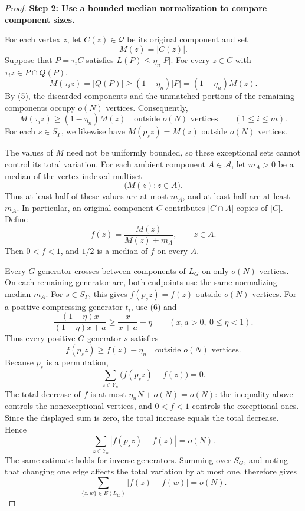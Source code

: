 \documentclass[10pt]{article}
\newcommand{\stephead}[1]{\par\medskip\noindent\textbf{#1}\par\smallskip}
\newcommand{\abs}[1]{\left|#1\right|}
\begin{document}
\begin{proof}
\stephead{Step 2: Use a bounded median normalization to compare component sizes.}
For each vertex $z$, let $C(z)\in\mathcal Q$ be its original component and set
\[
M(z)=\abs{C(z)}.
\]
Suppose that $P=\tau_iC$ satisfies $L(P)\leq\eta_n\abs{P}$. For every $z\in C$ with $\tau_iz\in P\cap Q(P)$,
\[
M(\tau_iz)=\abs{Q(P)}\geq(1-\eta_n)\abs{P}=(1-\eta_n)M(z).
\]
By (5), the discarded components and the unmatched portions of the remaining components occupy $o(N)$ vertices. Consequently,
\begin{equation}
M(\tau_iz)\geq(1-\eta_n)M(z)\quad\text{outside $o(N)$ vertices}\qquad(1\leq i\leq m).
\tag{6}
\end{equation}
For each $s\in S_\Gamma$, we likewise have $M(p_sz)=M(z)$ outside $o(N)$ vertices.

The values of $M$ need not be uniformly bounded, so these exceptional sets cannot control its total variation. For each ambient component $A\in\mathcal A$, let $m_A>0$ be a median of the vertex-indexed multiset
\[
\bigl(M(z):z\in A\bigr).
\]
Thus at least half of these values are at most $m_A$, and at least half are at least $m_A$. In particular, an original component $C$ contributes $\abs{C\cap A}$ copies of $\abs{C}$. Define
\[
f(z)=\frac{M(z)}{M(z)+m_A},\qquad z\in A.
\]
Then $0<f<1$, and $1/2$ is a median of $f$ on every $A$.

Every $G$-generator crosses between components of $L_G$ on only $o(N)$ vertices. On each remaining generator arc, both endpoints use the same normalizing median $m_A$. For $s\in S_\Gamma$, this gives $f(p_sz)=f(z)$ outside $o(N)$ vertices. For a positive compressing generator $t_i$, use (6) and
\[
\frac{(1-\eta)x}{(1-\eta)x+a}\geq\frac{x}{x+a}-\eta\qquad(x,a>0,\ 0\leq\eta<1).
\]
Thus every positive $G$-generator $s$ satisfies
\[
f(p_sz)\geq f(z)-\eta_n\quad\text{outside $o(N)$ vertices}.
\]
Because $p_s$ is a permutation,
\[
\sum_{z\in Y_n}\bigl(f(p_sz)-f(z)\bigr)=0.
\]
The total decrease of $f$ is at most $\eta_nN+o(N)=o(N)$: the inequality above controls the nonexceptional vertices, and $0<f<1$ controls the exceptional ones. Since the displayed sum is zero, the total increase equals the total decrease. Hence
\[
\sum_{z\in Y_n}\abs{f(p_sz)-f(z)}=o(N).
\]
The same estimate holds for inverse generators. Summing over $S_G$, and noting that changing one edge affects the total variation by at most one, therefore gives
\begin{equation}
\sum_{\{z,w\}\in E(L_G)}\abs{f(z)-f(w)}=o(N).
\tag{7}
\end{equation}


\end{proof}
\end{document}
